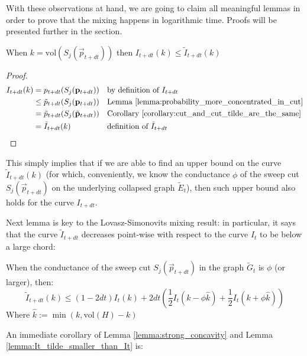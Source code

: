 \documentclass[../main.tex]{subfiles}
\begin{document}
With these observations at hand, we are going to claim all meaningful lemmas in order to prove that the mixing happens in logarithmic time. Proofs will be presented further in the section.

\begin{lemma}
\label{lemma:It_tilde_smaller_than_It}
    When $k=\text{vol}(S_j(\vec{p}_{t+dt}))$ then
    $I_{t+dt}(k) \leq \tilde{I}_{t+dt}(k)$
\end{lemma}

\begin{proof}
    \begin{align}
        I_{t+dt}(k) & = p_{t+dt}(S_j(\vec{p}_{t+dt})) && \text{by definition of } I_{t+dt} \\ 
        & \leq \tilde{p}_{t+dt}(S_j(\vec{p}_{t+dt})) && \text{Lemma \ref{lemma:probability_more_concentrated_in_cut}} \\
        & = \tilde{p}_{t+dt}(S_j(\tilde{\vec{p}}_{t+dt})) && \text{Corollary \ref{corollary:cut_and_cut_tilde_are_the_same}} \\
        & = \tilde{I}_{t+dt}(k) && \text{definition of } \tilde{I}_{t+dt}
    \end{align}
\end{proof}

This simply implies that if we are able to find an upper bound on the curve $\tilde{I}_{t+dt}(k)$ (for which, conveniently, we know the conductance $\phi$ of the sweep cut $S_j(\vec{p}_{t+dt})$ on the underlying collapsed graph $\tilde{E}_t$), then such upper bound also holds for the curve $I_{t+dt}$.

Next lemma is key to the Lovasz-Simonovits mixing result: in particular, it says that the curve $\tilde{I}_{t+dt}$ decreases point-wise with respect to the curve $I_t$ to be below a large chord: 

\begin{lemma}
\label{lemma:strong_concavity}
    When the conductance of the sweep cut $S_j(\vec{p}_{t+dt})$ in the graph $\tilde{G}_t$ is $\phi$ (or larger), then:
    \begin{equation}
        \tilde{I}_{t+dt}(k) \leq (1 - 2dt) I_t(k) + 2dt\left(\frac{1}{2} I_t(k - \phi \hat{k}) + \frac{1}{2}I_t(k + \phi \hat{k})\right)
    \end{equation}
    Where $\hat{k} := \min(k, \text{vol}(H)-k)$
\end{lemma}

An immediate corollary of Lemma \ref{lemma:strong_concavity} and Lemma \ref{lemma:It_tilde_smaller_than_It} is:
\end{document}
